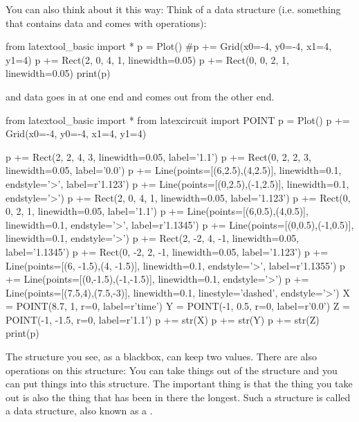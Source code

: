 You can also think about it this way: Think of a data structure (i.e.
something that contains data and comes with operations):
\begin{python}
from latextool_basic import *
p = Plot()
#p += Grid(x0=-4, y0=-4, x1=4, y1=4)
p += Rect(2, 0, 4, 1, linewidth=0.05)
p += Rect(0, 0, 2, 1, linewidth=0.05)
print(p)
\end{python}
and data goes in at one end and comes out from the other end.
\begin{python}
from latextool_basic import *
from latexcircuit import POINT
p = Plot()
p += Grid(x0=-4, y0=-4, x1=4, y1=4)

p += Rect(2, 2, 4, 3, linewidth=0.05, label='1.1')
p += Rect(0, 2, 2, 3, linewidth=0.05, label='0.0')
p += Line(points=[(6,2.5),(4,2.5)], linewidth=0.1, endstyle='>', label=r'1.123')
p += Line(points=[(0,2.5),(-1,2.5)], linewidth=0.1, endstyle='>')
p += Rect(2, 0, 4, 1, linewidth=0.05, label='1.123')
p += Rect(0, 0, 2, 1, linewidth=0.05, label='1.1')
p += Line(points=[(6,0.5),(4,0.5)], linewidth=0.1, endstyle='>', label=r'1.1345')
p += Line(points=[(0,0.5),(-1,0.5)], linewidth=0.1, endstyle='>')
p += Rect(2, -2, 4, -1, linewidth=0.05, label='1.1345')
p += Rect(0, -2, 2, -1, linewidth=0.05, label='1.123')
p += Line(points=[(6, -1.5),(4, -1.5)], linewidth=0.1, endstyle='>', label=r'1.1355')
p += Line(points=[(0,-1.5),(-1,-1.5)], linewidth=0.1, endstyle='>')
p += Line(points=[(7.5,4),(7.5,-3)], linewidth=0.1, linestyle='dashed', endstyle='>')
X = POINT(8.7, 1, r=0, label=r'time')
Y = POINT(-1, 0.5, r=0, label=r'0.0')
Z = POINT(-1, -1.5, r=0, label=r'1.1')
p += str(X)
p += str(Y)
p += str(Z)
print(p)
\end{python}
The structure you see, as a blackbox, can keep two values. There are
also operations on this structure: You can take things out of the
structure and you can put things into this structure. The important
thing is that the thing you take out is also the thing that has been in
there the longest. Such a structure is called a
 data structure, also known as a
.

